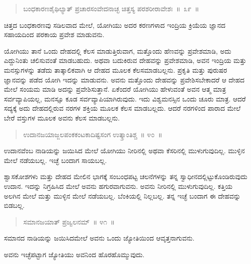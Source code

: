 \vspace{-0.3cm}

\begin{verse}
ಬಂಧಕಾರಣಶೈಥಿಲ್ಯಾತ್​ ಪ್ರಚಾರಸಂವೇದನಾಚ್ಛ ಚಿತ್ತಸ್ಯ ಪರಶರೀರಾವೇಶಃ~॥~೩೯~॥
\end{verse}

\vspace{-0.3cm}

ಚಿತ್ತದ ಬಂಧಕಾರಣವು ಸಡಿಲವಾದ ಮೇಲೆ, ಯೋಗಿಯು ಅದರ ಕರಣಗಳಾದ ಇಂದ್ರಿಯ ಕ್ರಿಯೆಯ ಜ್ಞಾನದ ಸಹಾಯದಿಂದ ಪರಕಾಯ ಪ್ರವೇಶ ಮಾಡುವನು. 

ಯೋಗಿಯು ತಾನೆ ಒಂದು ದೇಹದಲ್ಲಿ ಕೆಲಸ ಮಾಡುತ್ತಿರುವಾಗ, ಮತ್ತೊಂದು ಹೆಣವನ್ನು ಪ್ರವೇಶಮಾಡಿ, ಅದು ಎದ್ದುನಿಂತು ಚಲಿಸುವಂತೆ ಮಾಡಬಹುದು. ಅಥವಾ ಬದುಕಿರುವ ದೇಹವನ್ನು ಪ್ರವೇಶಮಾಡಿ, ಅವನ ಇಂದ್ರಿಯ ಮತ್ತು ಮನಸ್ಸುಗಳನ್ನು ತಡೆದು ತಾತ್ಕಾಲಿಕವಾಗಿ ಆ ದೇಹದ ಮೂಲಕ ಕೆಲಸಮಾಡಬಲ್ಲನು. ಪ್ರಕೃತಿ ಮತ್ತು ಪುರುಷರ ಜ್ಞಾನವನ್ನು ಪಡೆದ ಯೋಗಿ ಇದನ್ನು ಮಾಡುವನು. ಅವನು ಮತ್ತೊಂದು ದೇಹವನ್ನು ಪ್ರವೇಶಿಸಬೇಕಾದರೆ ಆ ದೇಹದ ಮೇಲೆ ಸಂಯಮ ಮಾಡಿ ಅದನ್ನು ಪ್ರವೇಶಿಸುತ್ತಾನೆ. ಏಕೆಂದರೆ ಯೋಗಿಯು ಹೇಳುವಂತೆ ಅವನ ಆತ್ಮ ಮಾತ್ರ ಸರ್ವವ್ಯಾಪಿಯಲ್ಲ, ಮನಸ್ಸೂ ಕೂಡ ಸರ್ವವ್ಯಾಪಿಯಾಗಿರುವುದು. ಇದು ವಿಶ್ವಮನಸ್ಸಿನ ಒಂದು ಚೂರು ಮಾತ್ರ. ಆದರೆ ಸದ್ಯಕ್ಕೆ ಅದು ದೇಹದಲ್ಲಿರುವ ನರಗಳ ಶಕ್ತಿಯ ಮೂಲಕ ಕೆಲಸ ಮಾಡಬಲ್ಲದು. ಆದರೆ ನರಗಳಿಂದ ಪಾರಾದ ಮೇಲೆ ಬೇರೆ ವಸ್ತುಗಳ ಮೂಲಕ ಅವನು ಕೆಲಸ ಮಾಡಬಲ್ಲನು. 

\vspace{-0.3cm}

\begin{verse}
ಉದಾನಜಯಾಜ್ಜಲಪಂಕಕಂಟಕಾದಿಷ್ಟಸಂಗ ಉತ್ಕ್ರಾಂತಿಶ್ಚ~॥ ೪೦~॥
\end{verse}

\vspace{-0.3cm}

ಉದಾನವೆಂಬ ನಾಡಿಯನ್ನು ಜಯಿಸಿದ ಮೇಲೆ ಯೋಗಿಯು ನೀರಿನಲ್ಲಿ ಅಥವಾ ಕೆಸರಿನಲ್ಲಿ ಮುಳುಗುವುದಿಲ್ಲ. ಮುಳ್ಳಿನ ಮೇಲೆ ನಡೆಯಬಲ್ಲ. ಇಚ್ಛೆ ಬಂದಾಗ ಸಾಯಬಲ್ಲ. 

ಶ್ವಾಸಕೋಶಗಳು ಮತ್ತು ದೇಹದ ಮೇಲಿನ ಭಾಗಕ್ಕೆ ಸಂಬಂಧಪಟ್ಟ ಚಲನೆಗಳನ್ನು ತನ್ನ ಸ್ವಾಧೀನದಲ್ಲಿಟ್ಟುಕೊಂಡಿರುವುದು ಉದಾನ. ಇದನ್ನು ನಿಗ್ರಹಿಸಿದ ಮೇಲೆ ಅವನು ಹಗುರವಾಗುವನು. ಅವನು ನೀರಿನಲ್ಲಿ ಮುಳುಗುವುದಿಲ್ಲ. ಕತ್ತಿಯ ಅಲಗಿನ ಮೇಲೆ ಮತ್ತು ಮುಳ್ಳಿನ ಮೇಲೆ ನಡೆಯಬಲ್ಲ. ಬೆಂಕಿಯಲ್ಲಿ ನಿಲ್ಲಬಲ್ಲ. ತನ್ನ ಇಚ್ಛೆ ಬಂದಾಗ ಈ ದೇಹವನ್ನು ಬಿಡಬಲ್ಲ. 

\vspace{-0.3cm}

\begin{verse}
ಸಮಾನಜಯಾತ್​ ಪ್ರಜ್ವಲನಮ್​~॥ ೪೧~॥
\end{verse}

\vspace{-0.3cm}

ಸಮಾನದ ನಾಡಿಯನ್ನು ಜಯಿಸಿದಮೇಲೆ ಅವನು ಒಂದು ಜ್ಯೋತಿಯಿಂದ ಆವೃತ್ತನಾಗುವನು. 

ಅವನು ಇಚ್ಛೆಪಟ್ಟಾಗ ಜ್ಯೋತಿಯು ಅವನಿಂದ ಹೊರಹೊಮ್ಮುವುದು. 

